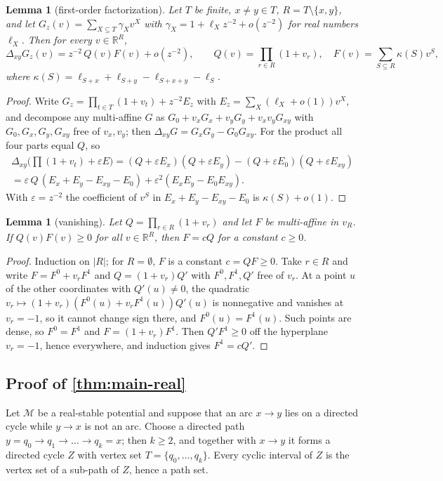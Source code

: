\documentclass[11pt]{amsart}
\theoremstyle{plain}
\newtheorem{lemma}[theorem]{Lemma}
\theoremstyle{definition}
\theoremstyle{remark}
\numberwithin{equation}{section}
\newcommand{\RR}{\mathbb{R}}
\newcommand{\Mpot}{\mathcal{M}}           %
\begin{document}
\begin{lemma}[first-order factorization]\label{lem:first-order}
Let $T$ be finite, $x\ne y\in T$, $R=T\setminus\{x,y\}$, and let $G_z(v)=\sum_{X\subseteq T}\gamma_Xv^X$ with $\gamma_X=1+\ell_Xz^{-2}+o(z^{-2})$ for real numbers $\ell_X$. Then for every $v\in\RR^R$,
\[
\Delta_{xy}G_z(v)=z^{-2}\,Q(v)F(v)+o(z^{-2}),\qquad Q(v)=\prod_{r\in R}(1+v_r),\quad F(v)=\sum_{S\subseteq R}\kappa(S)v^S,
\]
where $\kappa(S)=\ell_{S+x}+\ell_{S+y}-\ell_{S+x+y}-\ell_S$.
\end{lemma}
\begin{proof}
Write $G_z=\prod_{t\in T}(1+v_t)+z^{-2}E_z$ with $E_z=\sum_X(\ell_X+o(1))v^X$, and decompose any multi-affine $G$ as $G_0+v_xG_x+v_yG_y+v_xv_yG_{xy}$ with $G_0,G_x,G_y,G_{xy}$ free of $v_x,v_y$; then $\Delta_{xy}G=G_xG_y-G_0G_{xy}$. For the product all four parts equal $Q$, so
\begin{multline*}
\Delta_{xy}\bigl(\textstyle\prod(1+v_t)+\varepsilon E\bigr)=(Q+\varepsilon E_x)(Q+\varepsilon E_y)-(Q+\varepsilon E_0)(Q+\varepsilon E_{xy})\\
=\varepsilon\,Q\,(E_x+E_y-E_{xy}-E_0)+\varepsilon^2(E_xE_y-E_0E_{xy}).
\end{multline*}
With $\varepsilon=z^{-2}$ the coefficient of $v^S$ in $E_x+E_y-E_{xy}-E_0$ is $\kappa(S)+o(1)$.
\end{proof}

\begin{lemma}[vanishing]\label{lem:vanishing}
Let $Q=\prod_{r\in R}(1+v_r)$ and let $F$ be multi-affine in $v_R$. If $Q(v)F(v)\ge0$ for all $v\in\RR^R$, then $F=cQ$ for a constant $c\ge0$.
\end{lemma}
\begin{proof}
Induction on $|R|$; for $R=\emptyset$, $F$ is a constant $c=QF\ge0$. Take $r\in R$ and write $F=F^0+v_rF^1$ and $Q=(1+v_r)Q'$ with $F^0,F^1,Q'$ free of $v_r$. At a point $u$ of the other coordinates with $Q'(u)\ne0$, the quadratic $v_r\mapsto(1+v_r)(F^0(u)+v_rF^1(u))Q'(u)$ is nonnegative and vanishes at $v_r=-1$, so it cannot change sign there, and $F^0(u)=F^1(u)$. Such points are dense, so $F^0=F^1$ and $F=(1+v_r)F^1$. Then $Q'F^1\ge0$ off the hyperplane $v_r=-1$, hence everywhere, and induction gives $F^1=cQ'$.
\end{proof}

\subsection{Proof of \texorpdfstring{\cref{thm:main-real}}{Theorem 9.5}}
Let $\Mpot$ be a real-stable potential and suppose that an arc $x\to y$ lies on a directed cycle while $y\to x$ is not an arc. Choose a directed path $y=q_0\to q_1\to\dots\to q_k=x$; then $k\ge2$, and together with $x\to y$ it forms a directed cycle $Z$ with vertex set $T=\{q_0,\dots,q_k\}$. Every cyclic interval of $Z$ is the vertex set of a sub-path of $Z$, hence a path set.
\end{document}
